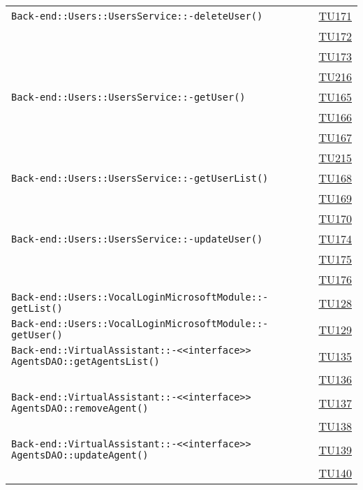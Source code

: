 \begin{longtable}{|>{\centering}m{12cm}|m{1cm}<{\centering}|}
\texttt{Back-end::Users::UsersService::-\linebreak deleteUser()} & \hyperlink{TU171}{TU171}\\ & \hyperlink{TU172}{TU172}\\ & \hyperlink{TU173}{TU173}\\ & \hyperlink{TU216}{TU216}\\ \hline
\texttt{Back-end::Users::UsersService::-\linebreak getUser()} & \hyperlink{TU165}{TU165}\\ & \hyperlink{TU166}{TU166}\\ & \hyperlink{TU167}{TU167}\\ & \hyperlink{TU215}{TU215}\\ \hline
\texttt{Back-end::Users::UsersService::-\linebreak getUserList()} & \hyperlink{TU168}{TU168}\\ & \hyperlink{TU169}{TU169}\\ & \hyperlink{TU170}{TU170}\\ \hline
\texttt{Back-end::Users::UsersService::-\linebreak updateUser()} & \hyperlink{TU174}{TU174}\\ & \hyperlink{TU175}{TU175}\\ & \hyperlink{TU176}{TU176}\\ \hline
\texttt{Back-end::Users::VocalLoginMicrosoftModule::-\linebreak getList()} & \hyperlink{TU128}{TU128}\\ \hline
\texttt{Back-end::Users::VocalLoginMicrosoftModule::-\linebreak getUser()} & \hyperlink{TU129}{TU129}\\ \hline
\texttt{Back-end::VirtualAssistant::-\linebreak <<interface>> AgentsDAO::getAgentsList()} & \hyperlink{TU135}{TU135}\\ & \hyperlink{TU136}{TU136}\\ \hline
\texttt{Back-end::VirtualAssistant::-\linebreak <<interface>> AgentsDAO::removeAgent()} & \hyperlink{TU137}{TU137}\\ & \hyperlink{TU138}{TU138}\\ \hline
\texttt{Back-end::VirtualAssistant::-\linebreak <<interface>> AgentsDAO::updateAgent()} & \hyperlink{TU139}{TU139}\\ & \hyperlink{TU140}{TU140}\\ \hline

\end{longtable}
